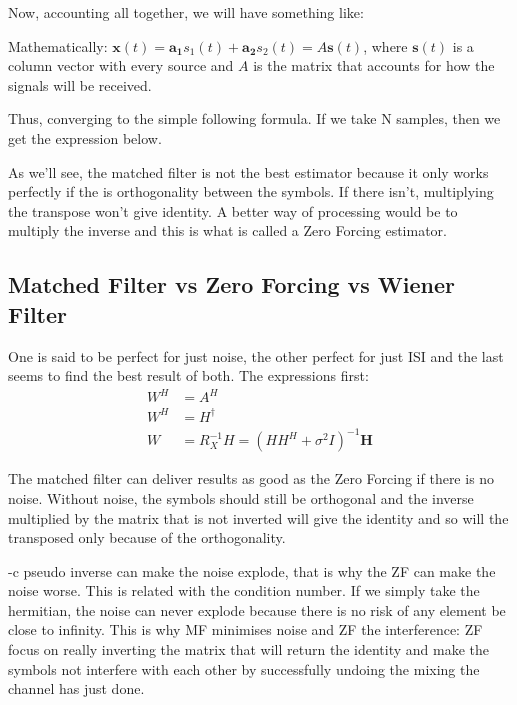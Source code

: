 \documentclass[12pt, a4paper]{article}
\begin{document}
\par Now, accounting all together, we will have something like: 


\par Mathematically: $\mathbf{x}(t) = \mathbf{a_1}s_1(t) + \mathbf{a_2}s_2(t) = A \mathbf{s}(t)$, where $\mathbf{s}(t)$ is a column vector with every source and $A$ is the matrix that accounts for how the signals will be received.

\par Thus, converging to the simple following formula. If we take N samples, then we get the expression below.



\par As we'll see, the matched filter is not the best estimator because it only works perfectly if the is orthogonality between the symbols. If there isn't, multiplying the transpose won't give identity. A better way of processing would be to multiply the inverse and this is what is called a Zero Forcing estimator.




\subsection{Matched Filter vs Zero Forcing vs Wiener Filter}
\par One is said to be perfect for just noise, the other perfect for just ISI and the last seems to find the best result of both. The expressions first:
\begin{align}
    W^H &= A^H \\
    W^H &= H^\dagger \\
    W &= R_X^{-1}H = (H H^H + \sigma^2I)^{-1}\mathbf{H}
\end{align}

\par The matched filter can deliver results as good as the Zero Forcing if there is no noise. Without noise, the symbols should still be orthogonal and the inverse multiplied by the matrix that is not inverted will give the identity and so will the transposed only because of the orthogonality. 



-c pseudo inverse can make the noise explode, that is why the ZF can make the noise worse. This is related with the condition number. If we simply take the hermitian, the noise can never explode because there is no risk of any element be close to infinity.
This is why MF minimises noise and ZF the interference: ZF focus on really inverting the matrix that will return the identity and make the symbols not interfere with each other by successfully undoing the mixing the channel has just done.
\end{document}
